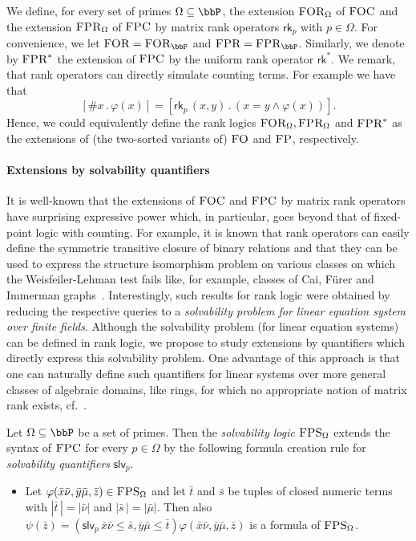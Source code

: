 \documentclass[a4paper,UKenglish]{lipics}
\newcommand{\card}[1]{\ensuremath{|#1|}}
\newcommand{\logic}[1]{\ensuremath{\textsc{#1}}\xspace}
\newcommand{\FO}{\logic{FO}}
\newcommand{\FOC}{\logic{FOC}}
\newcommand{\FP}{\logic{FP}}
\newcommand{\FPC}{\logic{FPC}}
\newcommand{\FPRK}{\logic{FPR}}
\newcommand{\FPR}{\FPRK}
\newcommand{\FPSx}[1]{\ensuremath{\logic{FPS}_{#1}}\xspace}
\newcommand{\FOR}{\ensuremath{\logic{FOR}}\xspace}
\newcommand{\FORx}[1]{\ensuremath{\logic{FOR}_{#1}}\xspace}
\newcommand{\FPRvar}{\ensuremath{\logic{FPR}^*}\xspace}
\newcommand{\FPRx}[1]{\ensuremath{\logic{FPR}_{#1}}\xspace}
\newcommand{\slvp}{\ensuremath{\textsf{slv}_p}\xspace}
\newcommand{\rkp}{\ensuremath{\textsf{rk}_p}\xspace}
\newcommand{\rk}{\ensuremath{\textsf{rk}^*}\xspace}
\renewcommand{\phi}{\varphi}
\newcommand{\bx}{{\bar x}}
\newcommand{\by}{{\bar y}}
\newcommand{\bz}{{\bar z}}
\newcommand{\bmu}{{\bar \mu}}
\newcommand{\bnu}{{\bar \nu}}
\theoremstyle{plain}
\begin{document}
\smallskip
We define, for every set of primes $\Omega \subseteq \bbP$, the extension 
$\FORx{\Omega}$ of $\FOC$ and the extension $\FPRx{\Omega}$ of $\FPC$ by  
matrix rank operators $\rkp$ with $p \in \Omega$. 
For convenience, we let $\FOR = \FORx{\bbP}$ and $\FPR = \FPRx{\bbP}$.
Similarly, we denote by $\FPRvar$ the extension of $\FPC$ by the uniform rank 
operator $\rk$. 
We remark, that rank operators can directly simulate counting terms. For 
example we have that 
\[ [\# x \,.\, \phi(x) ] = [ \rkp \,(x ,y) \, . \, ( x = y \wedge \phi(x)) ]. 
\] 
Hence, we could equivalently define the rank logics $\FORx{\Omega}, 
\FPRx{\Omega}$ and $\FPRvar$ as the extensions of (the two-sorted variants of) 
$\FO$ and $\FP$, respectively.
\smallskip


\paragraph*{Extensions by solvability quantifiers}

It is well-known that the extensions of $\FOC$ and $\FPC$ by matrix rank 
operators have surprising expressive power which, in particular, goes beyond 
that of fixed-point logic with counting. 
For example, it is known that rank operators can easily define the 
symmetric transitive closure of binary relations and that they can be used 
to express the structure isomorphism problem on various classes on which
the Weisfeiler-Lehman test fails like, for example, classes of Cai, Fürer and 
Immerman graphs~\cite{CFI92, DaGrHoLa09}.
Interestingly, such results for rank logic were obtained by reducing the 
respective queries to a \emph{solvability problem for linear equation system 
over finite fields}.
Although the solvability problem (for linear equation systems) can 
be defined in rank logic, we propose to study extensions by 
quantifiers which directly express this solvability problem. One 
advantage of this approach is that one can naturally define such 
quantifiers for 
linear systems over more 
general classes of algebraic domains, like rings, for which no appropriate 
notion of matrix rank exists, cf.\ \cite{DaGrHoKoPa13}. 

\medskip
Let $\Omega \subseteq \bbP$ be a set of primes. Then the \emph{solvability 
logic} $\FPSx{\Omega}$ extends the syntax of $\FPC$ for every $p \in 
\Omega$ by the following formula creation rule for \emph{solvability 
quantifiers} $\slvp$.
\begin{itemize}
 \item Let $\phi(\bx\bnu,\by\bmu,\bz) \in \FPSx{\Omega}$ and let 
 $\bar t$ and $\bar s$ be tuples of closed numeric terms with $\card {\bar 
t 
\,} = \card{\bnu}$ and $\card { \bar s \, } = \card{\bmu}$.
  Then also $\psi(\bz) = (\slvp \, \bx\bnu\leq \bar s, \by\bmu \leq \bar 
t) 
\phi(\bx\bnu,\by\bmu,\bz)$ is a formula of $\FPSx{\Omega}$. 
\end{itemize}
\end{document}

